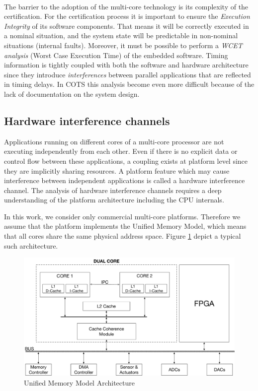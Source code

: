 \paragraph{} The barrier to the adoption of the multi-core technology is its complexity of the certification. For the certification process it is important to ensure the \emph{Execution Integrity} of its software components. That means it will be correctly executed in a nominal situation, and the system state will be predictable in non-nominal situations (internal faults). Moreover, it must be possible to perform a \emph{WCET analysis} (Worst Case Execution Time) of the embedded software. Timing information is tightly coupled with both the software and hardware architecture since they introduce \emph{interferences} between parallel applications that are reflected in timing delays. In COTS this analysis become even more difficult because of the lack of documentation on the system design.

\subsection{Hardware interference channels} 
Applications running on different cores of a multi-core processor are not executing independently from each other. Even if there is no explicit data or control flow between these applications, a coupling exists at platform level since they are implicitly sharing resources. A platform feature which may cause interference between independent applications is called a hardware interference channel. The analysis of hardware interference channels requires a deep understanding of the platform architecture including the CPU internals.
\par In this work, we consider only commercial multi-core platforms. Therefore we assume that the platform implements the Unified Memory Model, which means that all cores share the same physical address space. Figure \ref{fig:unifiedmemorymodel} depict a typical such architecture.

\begin{figure}[htbp] 
\centering    
\includegraphics[width=1.0\textwidth]{UnifiedMemoryModel}
\caption{Unified Memory Model Architecture}
\label{fig:unifiedmemorymodel}
\end{figure}

